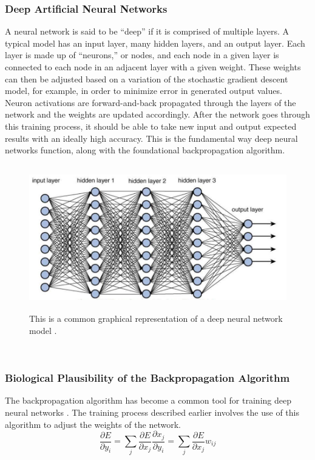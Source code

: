\documentclass[12pt]{article}
\begin{document}
\subsubsection{Deep Artificial Neural Networks}
A neural network is said to be ``deep'' if it is comprised of multiple layers. A typical model has an input layer, many hidden layers, and an output layer. Each layer is made up of “neurons,” or nodes, and each node in a given layer is connected to each node in an adjacent layer with a given weight. These weights can then be adjusted based on a variation of the stochastic gradient descent model, for example, in order to minimize error in generated output values. Neuron activations are forward-and-back propagated through the layers of the network and the weights are updated accordingly. After the network goes through this training process, it should be able to take new input and output expected results with an ideally high accuracy. This is the fundamental way deep neural networks function, along with the foundational backpropagation algorithm.
\begin{figure}[ht!] %
\centering
\hspace*{0cm} 
\includegraphics[height=2.5in]{deepNet.JPG}
\caption{This is a common graphical representation of a deep neural network model \cite{c16}.}
\label{deep_neural_net__example}
\end{figure} \\

\subsubsection{Biological Plausibility of the Backpropagation Algorithm}
The backpropagation algorithm has become a common tool for training deep neural networks \cite{c8}. The training process described earlier involves the use of this algorithm to adjust the weights of the network.
\begin{equation}\nonumber
\frac{\partial E}{\partial y_{i}} =\sum\limits _{j}\frac{\partial E}{\partial x_{j}}\frac{\partial x_{j}}{\partial y_{i}} =\sum\limits _{j}\frac{\partial E}{\partial x_{j}} w_{ij}
\end{equation} 
\end{document}
